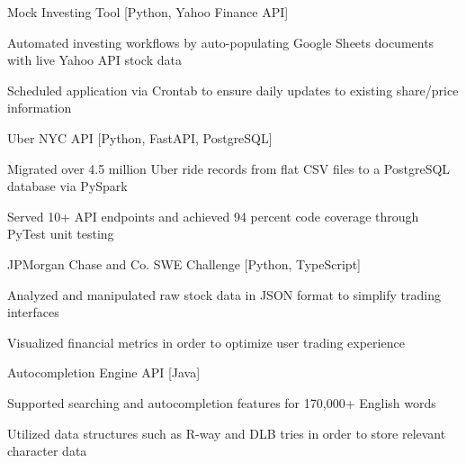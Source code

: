 
\begin{cventries}
  \cventry
    {} %
    {Mock Investing Tool [Python, Yahoo Finance API]} %
    {} %
    {} %
    {
      \begin{cvitems} %
        \item {Automated investing workflows by auto-populating Google Sheets documents with live Yahoo API stock data}
		\item {Scheduled application via Crontab to ensure daily updates to existing share/price information}
      \end{cvitems}
    }
    
    \cventry
    {} %
    {Uber NYC API [Python, FastAPI, PostgreSQL]} %
    {} %
    {} %
    {
      \begin{cvitems} %
      	\item {Migrated over 4.5 million Uber ride records from flat CSV files to a PostgreSQL database via PySpark}
		\item {Served 10+ API endpoints and achieved 94 percent code coverage through PyTest unit testing}
      \end{cvitems}
    }
    
    \cventry
    {} %
    {JPMorgan Chase and Co. SWE Challenge [Python, TypeScript]} %
    {} %
    {} %
    {
      \begin{cvitems} %
      	\item {Analyzed and manipulated raw stock data in JSON format to simplify trading interfaces}
		\item {Visualized financial metrics in order to optimize user trading experience}
      \end{cvitems}
    }

    \cventry
    {} %
    {Autocompletion Engine API [Java]} %
    {} %
    {} %
    {
      \begin{cvitems} %
      	\item {Supported searching and autocompletion features for 170,000+ English words}
		\item {Utilized data structures such as R-way and DLB tries in order to store relevant character data}
      \end{cvitems}
    }
\end{cventries}